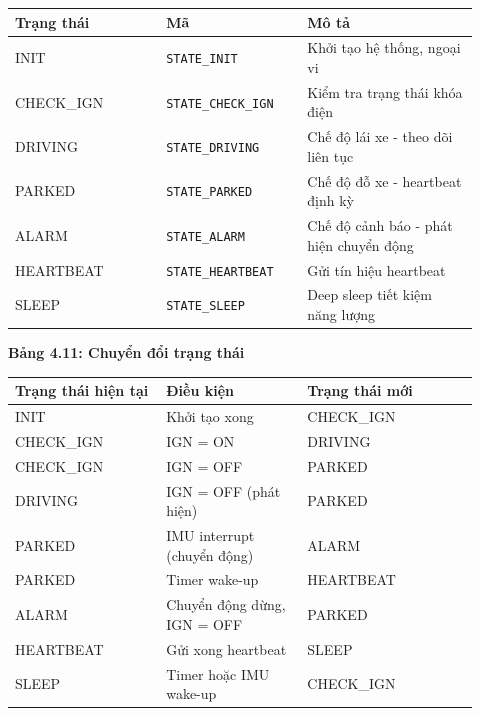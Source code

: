 \documentclass[13pt,a4paper]{extarticle}
\newcounter{none} %
\newcommand{\thesislongtableorignewline}{}
\let\thesislongtableorignewline\\
\renewcommand{\\}{\thesislongtableorignewline\hline}%
\let\\\thesislongtableorignewline
\newcommand{\thesistabletitle}[1]{%
  \begin{center}\textbf{#1}\end{center}%
}
\begin{document}
{\def\LTcaptype{none} %
\begin{longtable}{|p{0.30\linewidth}|p{0.28\linewidth}|p{0.34\linewidth}|}
\hline \textbf{Trạng thái} & \textbf{Mã} & \textbf{Mô tả} \\
\hline
\endhead
\hline
\endlastfoot
INIT & \texttt{STATE\_INIT} & Khởi tạo hệ thống, ngoại vi \\
CHECK\_IGN & \texttt{STATE\_CHECK\_IGN} & Kiểm tra trạng thái khóa
điện \\
DRIVING & \texttt{STATE\_DRIVING} & Chế độ lái xe - theo dõi liên tục \\
PARKED & \texttt{STATE\_PARKED} & Chế độ đỗ xe - heartbeat định kỳ \\
ALARM & \texttt{STATE\_ALARM} & Chế độ cảnh báo - phát hiện chuyển
động \\
HEARTBEAT & \texttt{STATE\_HEARTBEAT} & Gửi tín hiệu heartbeat \\
SLEEP & \texttt{STATE\_SLEEP} & Deep sleep tiết kiệm năng lượng \\
\end{longtable}
}

\thesistabletitle{Bảng 4.11: Chuyển đổi trạng thái}

{\def\LTcaptype{none} %
\begin{longtable}{|p{0.30\linewidth}|p{0.28\linewidth}|p{0.34\linewidth}|}
\hline \textbf{Trạng thái hiện tại} & \textbf{Điều kiện} & \textbf{Trạng thái mới} \\
\hline
\endhead
\hline
\endlastfoot
INIT & Khởi tạo xong & CHECK\_IGN \\
CHECK\_IGN & IGN = ON & DRIVING \\
CHECK\_IGN & IGN = OFF & PARKED \\
DRIVING & IGN = OFF (phát hiện) & PARKED \\
PARKED & IMU interrupt (chuyển động) & ALARM \\
PARKED & Timer wake-up & HEARTBEAT \\
ALARM & Chuyển động dừng, IGN = OFF & PARKED \\
HEARTBEAT & Gửi xong heartbeat & SLEEP \\
SLEEP & Timer hoặc IMU wake-up & CHECK\_IGN \\
\end{longtable}
}
\end{document}
